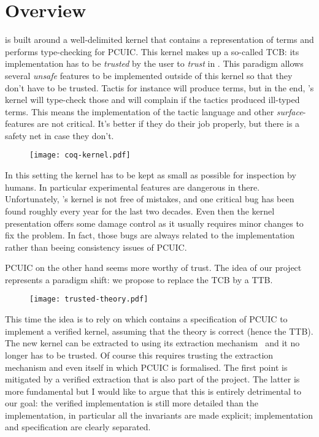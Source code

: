 \chapter{Overview}

\Coq is built around a well-delimited kernel that contains a representation of
terms and performs type-checking for \acrshort{PCUIC}.
This kernel makes up a so-called \acrlong{TCB}: its \ocaml implementation has to
be \emph{trusted} by the user to \emph{trust} in \Coq. This paradigm allows
several \emph{unsafe} features to be implemented outside of this kernel so that
they don't have to be trusted. Tactis for instance will produce terms, but in
the end, \Coq's kernel will type-check those and will complain if the tactics
produced ill-typed terms. This means the implementation of the tactic language
and other \emph{surface}-features are not critical. It's better if they do their
job properly, but there is a safety net in case they don't.
\begin{figure}[hb]
  \texttt{[image: coq-kernel.pdf]}
\end{figure}

In this setting the kernel has to be kept as small as possible for inspection
by humans. In particular experimental features are dangerous in there.
Unfortunately, \Coq's kernel is not free of mistakes, and one critical bug has
been found roughly every year for the last two decades. Even then the kernel
presentation offers some damage control as it usually requires minor changes to
fix the problem.
In fact, those bugs are always related to the implementation rather than beeing
consistency issues of \acrshort{PCUIC}.

\acrshort{PCUIC} on the other hand seems more worthy of trust. The idea of our
project~ represents a paradigm shift: we propose to
replace the \acrshort{TCB} by a \acrfull{TTB}.
\begin{figure}[hb]
  \texttt{[image: trusted-theory.pdf]}
\end{figure}

This time the idea is to rely on \MetaCoq which contains a specification of
\acrshort{PCUIC} to implement a verified kernel, assuming that the theory is
correct (hence the \acrshort{TTB}). The new kernel can be extracted to \Coq
using its extraction mechanism~ and it no longer has to be
trusted. Of course this requires trusting the extraction mechanism and even
\Coq itself in which \acrshort{PCUIC} is formalised.
The first point is mitigated by a verified extraction that is also part of the
project. The latter is more fundamental but I would like to argue that this is
entirely detrimental to our goal: the verified implementation is still more
detailed than the \ocaml implementation, in particular all the invariants
are made explicit; implementation and specification are clearly separated.

